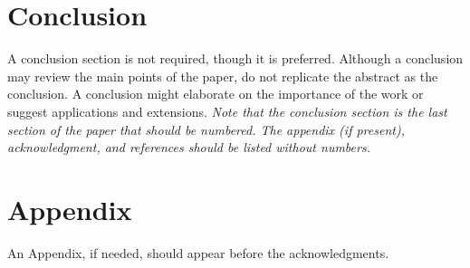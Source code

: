 \documentclass[conf]{new-aiaa}
\begin{document}



\section{Conclusion}
A conclusion section is not required, though it is preferred. Although a conclusion may review the main points of the paper, do not replicate the abstract as the conclusion. A conclusion might elaborate on the importance of the work or suggest applications and extensions. \textit{Note that the conclusion section is the last section of the paper that should be numbered. The appendix (if present), acknowledgment, and references should be listed without numbers.}


\section*{Appendix}

An Appendix, if needed, should appear before the acknowledgments.
\end{document}
